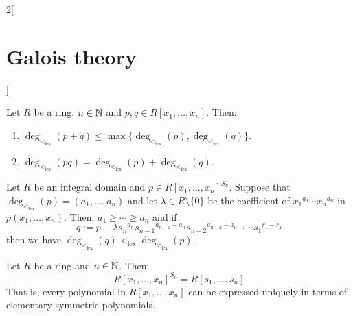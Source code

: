 \documentclass[../../../main.tex]{subfiles}
\begin{document}
\begin{multicols}{2}[\section{Galois theory}]
  \begin{prop}
    Let $R$ be a ring, $n\in\mathbb{N}$ and $p,q\in R[x_1,\ldots,x_n]$. Then:
    \begin{enumerate}
      \item $\deg_{<_\text{lex}}(p+q)\leq\max\{\deg_{<_\text{lex}}(p),\deg_{<_\text{lex}}(q)\}$.
      \item $\deg_{<_\text{lex}}(pq)=\deg_{<_\text{lex}}(p)+\deg_{<_\text{lex}}(q)$.
    \end{enumerate}
  \end{prop}
  \begin{lemma}
    Let $R$ be an integral domain and $p\in {R[x_1,\ldots,x_n]}^{S_n}$. Suppose that $\deg_{<_\text{lex}}(p)=(a_1,\ldots,a_n)$ and let $\lambda\in R\setminus\{0\}$ be the coefficient of ${x_1}^{a_1}\cdots{x_n}^{a_n}$ in $p(x_1,\ldots,x_n)$. Then, $a_1\geq \cdots\geq a_n$ and if $$q:=p-\lambda {s_n}^{a_n}{s_{n-1}}^{a_{n-1}-a_n}{s_{n-2}}^{a_{n-2}-a_{n-1}}\cdots {s_1}^{r_1-r_2}$$ then we have $\deg_{<_\text{lex}}(q)<_\text{lex}\deg_{<_\text{lex}}(p)$.
  \end{lemma}
  \begin{theorem}
    Let $R$ be a ring and $n\in\mathbb{N}$. Then: $${R[x_1,\ldots,x_n]}^{S_n}=R[s_1,\ldots,s_n]$$ That is, every polynomial in $R[x_1,\ldots,x_n]$ can be expressed uniquely in terms of elementary symmetric polynomials.
  \end{theorem}

\end{multicols}
\end{document}
